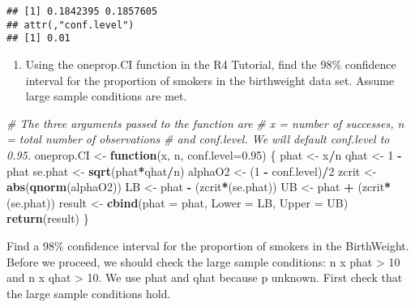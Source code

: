\documentclass[
]{article}
\newenvironment{Shaded}{\begin{snugshade}}{\end{snugshade}}
\newcommand{\CommentTok}[1]{\textcolor[rgb]{0.56,0.35,0.01}{\textit{#1}}}
\newcommand{\ControlFlowTok}[1]{\textcolor[rgb]{0.13,0.29,0.53}{\textbf{#1}}}
\newcommand{\DataTypeTok}[1]{\textcolor[rgb]{0.13,0.29,0.53}{#1}}
\newcommand{\DecValTok}[1]{\textcolor[rgb]{0.00,0.00,0.81}{#1}}
\newcommand{\FloatTok}[1]{\textcolor[rgb]{0.00,0.00,0.81}{#1}}
\newcommand{\KeywordTok}[1]{\textcolor[rgb]{0.13,0.29,0.53}{\textbf{#1}}}
\newcommand{\NormalTok}[1]{#1}
\newcommand{\OperatorTok}[1]{\textcolor[rgb]{0.81,0.36,0.00}{\textbf{#1}}}
\newcommand{\StringTok}[1]{\textcolor[rgb]{0.31,0.60,0.02}{#1}}
\providecommand{\tightlist}{%
  \setlength{\itemsep}{0pt}\setlength{\parskip}{0pt}}
\begin{document}
\begin{verbatim}
## [1] 0.1842395 0.1857605
## attr(,"conf.level")
## [1] 0.01
\end{verbatim}

\begin{enumerate}
\def\labelenumi{\arabic{enumi}.}
\setcounter{enumi}{2}
\tightlist
\item
  Using the oneprop.CI function in the R4 Tutorial, find the 98\%
  confidence interval for the proportion of smokers in the birthweight
  data set. Assume large sample conditions are met.
\end{enumerate}

\begin{Shaded}
\begin{Highlighting}[]
\CommentTok{# The three arguments passed to the function are}
\CommentTok{# x = number of successes, n = total number of observations}
\CommentTok{# and conf.level. We will default conf.level to 0.95.}
\NormalTok{oneprop.CI <-}\StringTok{ }\ControlFlowTok{function}\NormalTok{(x, n, }\DataTypeTok{conf.level=}\FloatTok{0.95}\NormalTok{) \{}
\NormalTok{  phat <-}\StringTok{ }\NormalTok{x}\OperatorTok{/}\NormalTok{n}
\NormalTok{  qhat <-}\StringTok{ }\DecValTok{1} \OperatorTok{-}\StringTok{ }\NormalTok{phat}
\NormalTok{  se.phat <-}\StringTok{ }\KeywordTok{sqrt}\NormalTok{(phat}\OperatorTok{*}\NormalTok{qhat}\OperatorTok{/}\NormalTok{n) }
\NormalTok{  alphaO2 <-}\StringTok{ }\NormalTok{(}\DecValTok{1} \OperatorTok{-}\StringTok{ }\NormalTok{conf.level)}\OperatorTok{/}\DecValTok{2}
\NormalTok{  zcrit <-}\StringTok{ }\KeywordTok{abs}\NormalTok{(}\KeywordTok{qnorm}\NormalTok{(alphaO2))}
\NormalTok{  LB <-}\StringTok{ }\NormalTok{phat }\OperatorTok{-}\StringTok{ }\NormalTok{(zcrit}\OperatorTok{*}\NormalTok{(se.phat))}
\NormalTok{  UB <-}\StringTok{ }\NormalTok{phat }\OperatorTok{+}\StringTok{ }\NormalTok{(zcrit}\OperatorTok{*}\NormalTok{(se.phat))}
\NormalTok{  result <-}\StringTok{ }\KeywordTok{cbind}\NormalTok{(}\DataTypeTok{phat =}\NormalTok{ phat, }\DataTypeTok{Lower =}\NormalTok{ LB, }\DataTypeTok{Upper =}\NormalTok{ UB)}
  \KeywordTok{return}\NormalTok{(result)}
\NormalTok{\}}
\end{Highlighting}
\end{Shaded}

Find a 98\% confidence interval for the proportion of smokers in the
BirthWeight. Before we proceed, we should check the large sample
conditions: n x phat \textgreater{} 10 and n x qhat \textgreater{} 10.
We use phat and qhat because p unknown. First check that the large
sample conditions hold.
\end{document}
